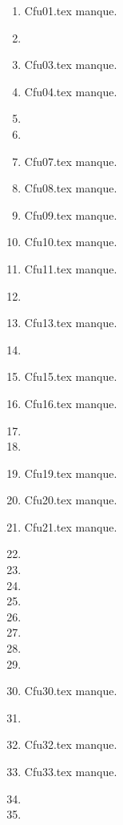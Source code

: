 \begin{enumerate}
  \item Cfu01.tex manque. 
  \item  
  \item Cfu03.tex manque. 
  \item Cfu04.tex manque. 
  \item  
  \item  
  \item Cfu07.tex manque. 
  \item Cfu08.tex manque. 
  \item Cfu09.tex manque. 
  \item Cfu10.tex manque. 
  \item Cfu11.tex manque. 
  \item  
  \item Cfu13.tex manque. 
  \item  
  \item Cfu15.tex manque. 
  \item Cfu16.tex manque. 
  \item  
  \item  
  \item Cfu19.tex manque. 
  \item Cfu20.tex manque. 
  \item Cfu21.tex manque. 
  \item  
  \item  
  \item  
  \item  
  \item  
  \item  
  \item  
  \item  
  \item Cfu30.tex manque. 
  \item  
  \item Cfu32.tex manque. 
  \item Cfu33.tex manque. 
  \item  
  \item  
\end{enumerate} 
